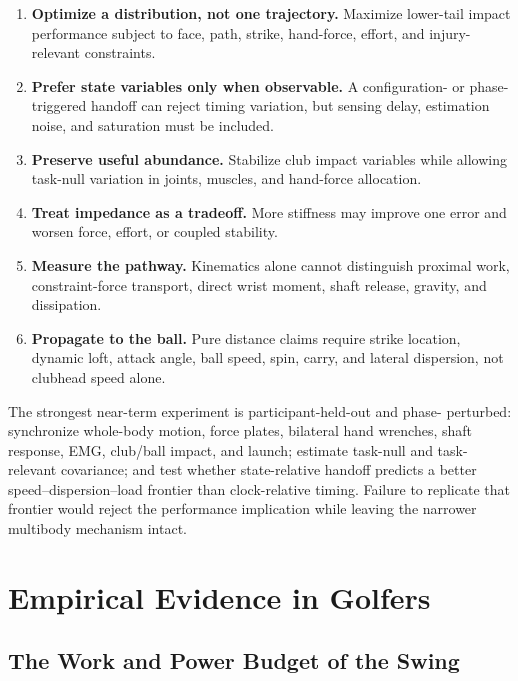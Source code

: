 \documentclass[
  letterpaper,
]{report}
\providecommand{\tightlist}{%
  \setlength{\itemsep}{0pt}\setlength{\parskip}{0pt}}
\begin{document}
\begin{enumerate}
\def\labelenumi{\arabic{enumi}.}
\tightlist
\item
  \textbf{Optimize a distribution, not one trajectory.} Maximize
  lower-tail impact performance subject to face, path, strike,
  hand-force, effort, and injury- relevant constraints.
\item
  \textbf{Prefer state variables only when observable.} A configuration-
  or phase-triggered handoff can reject timing variation, but sensing
  delay, estimation noise, and saturation must be included.
\item
  \textbf{Preserve useful abundance.} Stabilize club impact variables
  while allowing task-null variation in joints, muscles, and hand-force
  allocation.
\item
  \textbf{Treat impedance as a tradeoff.} More stiffness may improve one
  error and worsen force, effort, or coupled stability.
\item
  \textbf{Measure the pathway.} Kinematics alone cannot distinguish
  proximal work, constraint-force transport, direct wrist moment, shaft
  release, gravity, and dissipation.
\item
  \textbf{Propagate to the ball.} Pure distance claims require strike
  location, dynamic loft, attack angle, ball speed, spin, carry, and
  lateral dispersion, not clubhead speed alone.
\end{enumerate}

The strongest near-term experiment is participant-held-out and phase-
perturbed: synchronize whole-body motion, force plates, bilateral hand
wrenches, shaft response, EMG, club/ball impact, and launch; estimate
task-null and task-relevant covariance; and test whether state-relative
handoff predicts a better speed--dispersion--load frontier than
clock-relative timing. Failure to replicate that frontier would reject
the performance implication while leaving the narrower multibody
mechanism intact.

\chapter{Empirical Evidence in Golfers}\label{sec-evidence}

\section{The Work and Power Budget of the Swing}\label{sec-workbudget}
\end{document}

